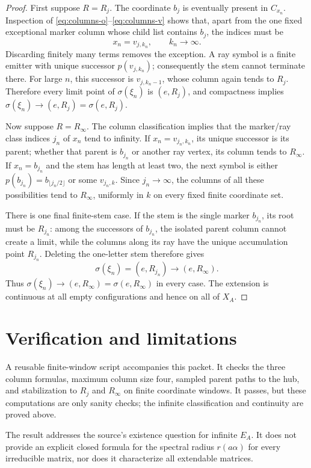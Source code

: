 \documentclass[11pt]{article}
\newcommand{\EA}{E_A}
\newcommand{\XA}{X_A}
\begin{document}
\begin{proof}
First suppose $R=R_j$.  The coordinate $b_j$ is eventually present in
$C_{x_n}$.  Inspection of \eqref{eq:columns-o}--\eqref{eq:columns-v} shows
that, apart from the one fixed exceptional marker column whose child list
contains $b_j$, the indices must be
\[
 x_n=v_{j,k_n},\qquad k_n\to\infty.
\]
Discarding finitely many terms removes the exception.  A ray symbol is a
finite emitter with unique successor $p(v_{j,k_n})$; consequently the stem
cannot terminate there.  For large $n$, this successor is
$v_{j,k_n-1}$, whose column again tends to $R_j$.  Therefore every limit point
of $\sigma(\xi_n)$ is $(e,R_j)$, and compactness implies
$\sigma(\xi_n)\to(e,R_j)=\sigma(e,R_j)$.

Now suppose $R=R_\infty$.  The column classification implies that the
marker/ray class indices $j_n$ of $x_n$ tend to infinity.  If
$x_n=v_{j_n,k_n}$, its unique successor is its parent; whether that parent is
$b_{j_n}$ or another ray vertex, its column tends to $R_\infty$.  If
$x_n=b_{j_n}$ and the stem has length at least two, the next symbol is either
$p(b_{j_n})=b_{\lfloor j_n/2\rfloor}$ or some $v_{j_n,k}$.  Since
$j_n\to\infty$, the columns of all these possibilities tend to $R_\infty$,
uniformly in $k$ on every fixed finite coordinate set.

There is one final finite-stem case.  If the stem is the single marker
$b_{j_n}$, its root must be $R_{j_n}$: among the successors of $b_{j_n}$,
the isolated parent column cannot create a limit, while the columns along its
ray have the unique accumulation point $R_{j_n}$.  Deleting the one-letter
stem therefore gives
\[
 \sigma(\xi_n)=(e,R_{j_n})\longrightarrow(e,R_\infty).
\]
Thus $\sigma(\xi_n)\to(e,R_\infty)=\sigma(e,R_\infty)$ in every case.
The extension is continuous at all empty configurations and hence on all of
$\XA$.
\end{proof}

\section{Verification and limitations}

A reusable finite-window script accompanies this packet.  It checks the three
column formulas, maximum column size four, sampled parent paths to the hub,
and stabilization to $R_j$ and $R_\infty$ on finite coordinate windows.  It
passes, but these computations are only sanity checks; the infinite
classification and continuity are proved above.

The result addresses the source's existence question for infinite $\EA$.
It does not provide an explicit closed formula for the spectral radius
$r(a\alpha)$ for every irreducible matrix, nor does it characterize all
extendable matrices.
\end{document}
